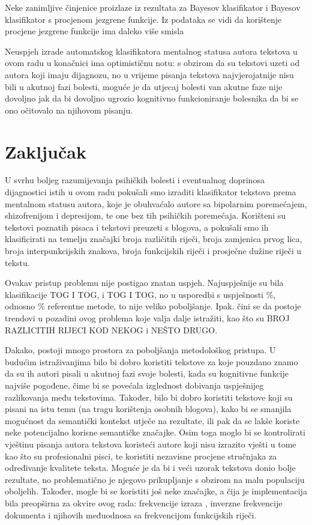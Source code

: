 \documentclass[10pt, a4paper]{article}
\begin{document}
Neke zanimljive činjenice proizlaze iz rezultata za Bayesov klasifikator i Bayesov klasifikator s procjenom jezgrene funkcije. Iz podataka se vidi da korištenje procjene jezgrene funkcije ima daleko više smisla 

Neuspjeh izrade automatskog klasifikatora mentalnog statusa autora tekstova u ovom radu u konačnici ima optimističnu notu: s obzirom da su tekstovi uzeti od autora koji imaju dijagnozu, no u vrijeme pisanja tekstova najvjerojatnije nisu bili u akutnoj fazi bolesti, moguće je da utjecaj bolesti van akutne faze nije dovoljno jak da bi dovoljno ugrozio kognitivno funkcioniranje bolesnika da bi se ono očitovalo na njihovom pisanju. 




\section{Zaključak}

U svrhu boljeg razumijevanja psihičkih bolesti i eventualnog doprinosa dijagnostici istih u ovom radu pokušali smo izraditi klasifikator tekstova prema mentalnom statusu autora, koje je obuhvaćalo autore sa bipolarnim poremećajem, shizofrenijom i depresijom, te one bez tih psihičkih poremećaja. Korišteni su tekstovi poznatih pisaca i tekstovi preuzeti s blogova, a pokušali smo ih klasificirati na temelju značajki broja različitih riječi, broja zamjenica prvog lica, broja interpunkcijskih znakova, broja funkcijskih riječi i prosječne dužine riječi u tekstu. 

Ovakav pristup problemu nije postigao znatan uspjeh. Najuspješnije su bila klasifikacije TOG I TOG, i TOG I TOG, no u usporedbi s uspješnosti \%, odnosno \% referentne metode, to nije veliko poboljšanje. Ipak. čini se da postoje trendovi u pozadini ovog problema koje valja dalje istražiti, kao što su BROJ RAZLICITIH RIJECI KOD NEKOG i NEŠTO DRUGO. 

Dakako, postoji mnogo prostora za poboljšanja metodološkog pristupa. U budućim istraživanjima bilo bi dobro koristiti tekstove za koje pouzdano znamo da su ih autori pisali u akutnoj fazi svoje bolesti, kada su kognitivne funkcije najviše pogođene, čime bi se povećala izglednost dobivanja uspješnijeg razlikovanja među tekstovima. Također, bilo bi dobro koristiti tekstove koji su pisani na istu temu (na tragu korištenja osobnih blogova), kako bi se smanjila mogućnost da semantički kontekst utječe na rezultate, ili pak da se lakše koriste neke potencijalno korisne semantičke značajke. Osim toga moglo bi se kontrolirati vještinu pisanja autora tekstova koristeći autore koji nisu izrazito vješti u tome kao što su profesionalni pisci, te koristiti nezavisne procjene stručnjaka za određivanje kvalitete teksta. Moguće je da bi i veći uzorak tekstova donio bolje rezultate, no problematično je njegovo prikupljanje s obzirom na malu populaciju oboljelih. Također, mogle bi se koristiti još neke značajke, a čija je implementacija bila preopširna za okvire ovog rada: frekvencije izraza , inverzne frekvencije dokumenta  i njihovih međuodnosa sa frekvencijom funkcijskih riječi.


 
\end{document}
